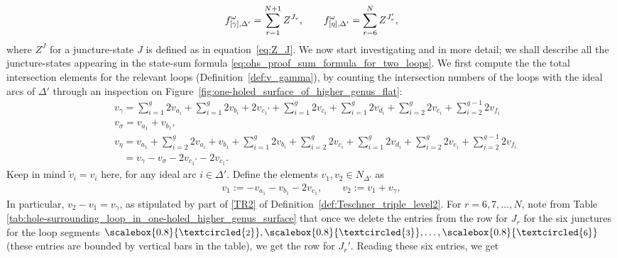 \documentclass[10pt,a4paper]{amsart}
\numberwithin{equation}{section}
\theoremstyle{definition}
\newcommand{\circled}[1]{\scalebox{0.8}{\textcircled{\fontsize{8}{9}\selectfont \raisebox{-0.1pt}{#1}}}}
\newcommand{\til}[1]{\widetilde{#1}}
\begin{document}
\begin{align}
\label{eq:ohs_proof_sum_formula_for_two_loops}
f^\omega_{[\gamma],\Delta'} = \sum_{r=1}^{N+1} Z^{J_r}, \qquad
f^\omega_{[\eta],\Delta'} = \sum_{r=6}^{N} Z^{J_r'},\vspace{-1mm}
\end{align}
where $Z^J$ for a juncture-state $J$ is defined as in equation~\eqref{eq:Z_J}.
We now start investigating  and  in more detail; we shall describe all the juncture-states appearing in the state-sum formula \eqref{eq:ohs_proof_sum_formula_for_two_loops}. We first compute the
the total intersection elements for the relevant loops (Definition~\ref{def:v_gamma}), by counting the intersection numbers of the loops with the ideal arcs of $\Delta'$ through an inspection on Figure~\ref{fig:one-holed_surface_of_higher_genus_flat}:\vspace{-1mm}
\begin{align}
\label{eq:ohs_proof_v_gamma}
&{v_\gamma} = \sum^g_{i=1} 2 {v_{a_i}} + \sum^g_{i=1} 2 {v_{b_i}} + 2{v_{c_1'}} + \sum^g_{i=1} 2 {v_{c_i}} + \sum^g_{i=1} 2 {v_{d_i}} + \sum^g_{i=2} 2 {v_{e_i}} + \sum^{g-1}_{i=2} 2 {v_{f_i}} \\[-1mm]
\nonumber
&{v_\sigma} = {v_{a_1}} + {v_{b_1}}, \\[-1mm]
\label{eq:ohs_proof_v_eta1}
&{v_\eta} = {v_{a_1}} + \sum^g_{i=2} 2 {v_{a_i}} + {v_{b_1}} + \sum^g_{i=1} 2 {v_{b_i}} + \sum^g_{i=2} 2 {v_{c_i}} + \sum^g_{i=1} 2 {v_{d_i}} + \sum^g_{i=2} 2 {v_{e_i}} + \sum^{g-1}_{i=2} 2 {v_{f_i}} \\[-1mm]
\label{eq:ohs_proof_v_eta2}
&\phantom{{v_\eta}}{} = {v_\gamma} - {v_\sigma} - 2 {v_{c_1'}} - 2 {v_{c_1}}.
\end{align}
Keep in mind $\til{v}_i=v_i$ here, for any ideal arc $i \in \Delta'$. Define the elements $v_1, v_2 \in N_{\Delta'}$ as
\begin{align}
\label{eq:ohs_proof_v_1_v_2}
v_1 := - v_{a_1} - v_{b_1} - 2v_{c_1}, \qquad
v_2 := v_1 + v_\gamma,
\end{align}
In particular, $v_2 - v_1 = v_\gamma$, as stipulated by part of \ref{TR2} of Definition~\ref{def:Teschner_triple_level2}. For $r=6,7,\dots,N$, note from Table \ref{tab:hole-surrounding_loop_in_one-holed_higher_genus_surface} that once we delete the entries from the row for $J_r$ for the six junctures for the loop segments $\circled{2},\circled{3},\dots,\circled{6}$ (these entries are bounded by vertical bars in the table), we get the row for $J_r'$. Reading these six entries, we get
\end{document}
